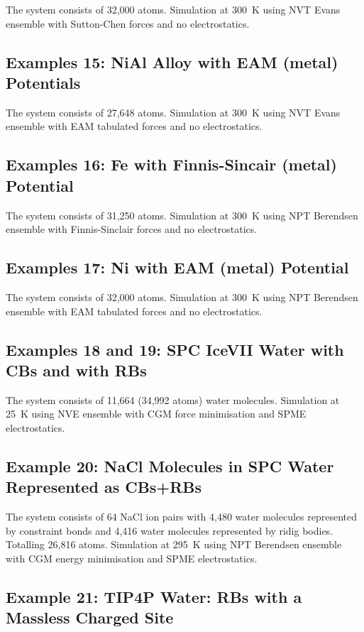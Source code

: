 The system consists of 32,000 atoms.  Simulation at 300~K using NVT
Evans ensemble with Sutton-Chen forces and no electrostatics.

\subsection{Examples 15: NiAl Alloy with EAM (metal) Potentials}

The system consists of 27,648 atoms.  Simulation at 300~K using NVT
Evans ensemble with EAM tabulated forces and no electrostatics.

\subsection{Examples 16: Fe with Finnis-Sincair (metal) Potential}

The system consists of 31,250 atoms.  Simulation at 300~K using NPT
Berendsen ensemble with Finnis-Sinclair forces and no electrostatics.

\subsection{Examples 17: Ni with EAM (metal) Potential}

The system consists of 32,000 atoms.  Simulation at 300~K using NPT
Berendsen ensemble with EAM tabulated forces and no electrostatics.

\subsection{Examples 18 and 19: SPC IceVII Water with CBs and with RBs}

The system consists of 11,664 (34,992 atoms) water molecules. Simulation
at 25~K using NVE ensemble with CGM force minimisation and SPME electrostatics.

\subsection{Example 20: NaCl Molecules in SPC Water Represented as CBs+RBs}

The system consists of 64 NaCl ion pairs with 4,480 water molecules
represented by constraint bonds and 4,416 water molecules represented
by ridig bodies.  Totalling 26,816 atoms.  Simulation at 295~K using NPT
Berendsen ensemble with CGM energy minimisation and SPME electrostatics.

\subsection{Example 21: TIP4P Water: RBs with a Massless Charged Site}

